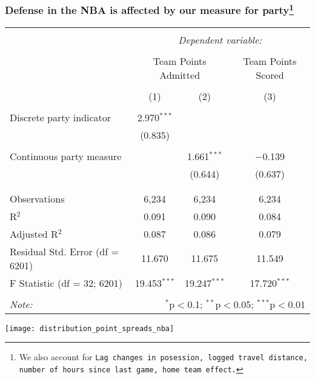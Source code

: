 \documentclass{beamer}
\begin{document}
\begin{frame}   \frametitle{Defense in the NBA is affected by our measure for party\footnote{\tiny{We also account for \texttt{Lag changes in posession, logged travel distance, number of hours since last game, home team effect.}}}}
\scriptsize{
\begin{tabular}{@{\extracolsep{5pt}}lccc}  \\[-1.8ex]\hline  \hline \\[-1.8ex]   & \multicolumn{3}{c}{\textit{Dependent variable:}} \\  \cline{2-4}  \\[-1.8ex] & \multicolumn{2}{c}{Team Points Admitted} & Team Points Scored \\  \\[-1.8ex] & (1) & (2) & (3)\\  \hline \\[-1.8ex]   Discrete party indicator & 2.970$^{***}$ &  &  \\    & (0.835) &  &  \\    & & & \\   Continuous party measure &  & 1.661$^{***}$ & $-$0.139 \\    &  & (0.644) & (0.637) \\    & & & \\  \hline \\[-1.8ex]  Observations & 6,234 & 6,234 & 6,234 \\  R$^{2}$ & 0.091 & 0.090 & 0.084 \\  Adjusted R$^{2}$ & 0.087 & 0.086 & 0.079 \\  Residual Std. Error (df = 6201) & 11.670 & 11.675 & 11.549 \\  F Statistic (df = 32; 6201) & 19.453$^{***}$ & 19.247$^{***}$ & 17.720$^{***}$ \\  \hline  \hline \\[-1.8ex]  \textit{Note:}  & \multicolumn{3}{r}{$^{*}$p$<$0.1; $^{**}$p$<$0.05; $^{***}$p$<$0.01} \\  \end{tabular} 
} \end{frame}


\begin{frame}
  \centering
  \texttt{[image: distribution\_point\_spreads\_nba]}
\end{frame}
\end{document}
